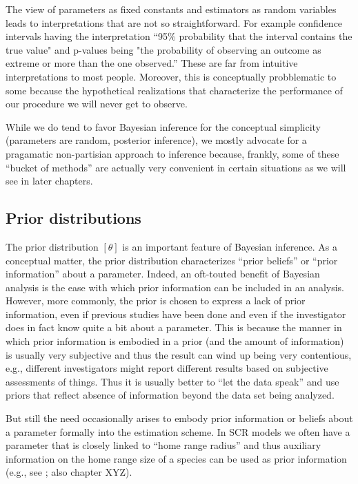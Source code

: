 The view of parameters as fixed constants and estimators as random variables
leads to interpretations that are not so straightforward. For
example confidence intervals having the interpretation ``95\%
probability that the interval contains the true value" and p-values
being "the probability of observing an outcome as extreme or more than
the one observed.'' These are far from intuitive interpretations to
most people.  Moreover, this is conceptually probblematic to some
because the hypothetical realizations that characterize the
performance of our procedure we will never get to observe.

While we do tend to favor Bayesian inference for the conceptual
simplicity (parameters are random, posterior inference), we mostly
advocate for a pragamatic non-partisian approach to inference because,
frankly, some of these ``bucket of methods'' are actually very
convenient in certain situations as we will see in later chapters.


\subsection{Prior distributions}


The prior distribution $[\theta]$ is an important feature of Bayesian
inference. As a conceptual matter,
the prior distribution characterizes ``prior beliefs'' or ``prior
information'' about a parameter. Indeed,
an oft-touted benefit of Bayesian analysis is the ease with which
prior information can be included in an analysis.
However, more commonly, the prior is chosen to
express a lack of prior information, even if previous studies have
been done and even if the investigator does in fact know quite a bit
about a parameter.
This is because
the manner in which prior information is embodied in a prior (and the
amount of information) is
usually very subjective and thus the result can wind up being very
contentious, e.g., different investigators might report different
results based on subjective assessments of things. Thus it is usually
better to ``let the data speak'' and use priors that reflect absence
of information beyond the data set being analyzed.

But still the need occasionally arises to embody prior information or
beliefs about a parameter formally into the estimation scheme.
 In SCR models we often have a parameter that is closely linked
to ``home range radius'' and thus auxiliary information on the home
range size of a species can be used as prior information (e.g., see
\citet{chandler_royle:2012} ; also chapter XYZ).

